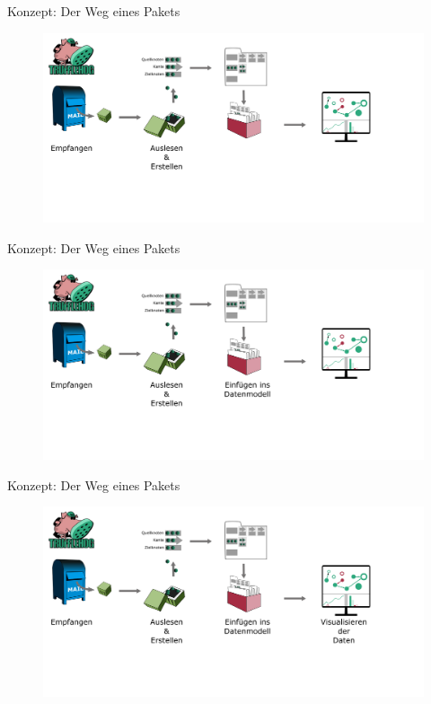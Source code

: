 \begin{frame}{Konzept: Der Weg eines Pakets}
	\begin{figure}
		\centering
		\includegraphics[width=\textwidth]{./images/path_trufflehog/2.png}
	\end{figure}
\end{frame}

\begin{frame}{Konzept: Der Weg eines Pakets}
	\begin{figure}
		\centering
		\includegraphics[width=\textwidth]{./images/path_trufflehog/3.png}
	\end{figure}
\end{frame}

\begin{frame}{Konzept: Der Weg eines Pakets}
	\begin{figure}
		\centering
		\includegraphics[width=\textwidth]{./images/path_trufflehog/4.png}
	\end{figure}
\end{frame} 